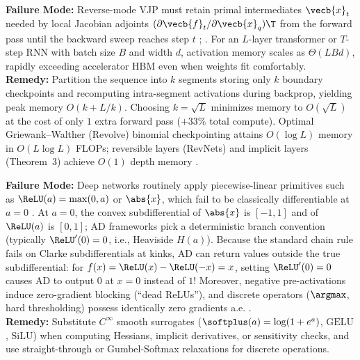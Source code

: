 \documentclass[../../../../master.tex]{subfiles}
\begin{document}
\begin{pitfall}
\textbf{Failure Mode:} Reverse-mode VJP must retain primal intermediates $\vecb{x}_t$ needed by local Jacobian adjoints $(\partial \vecb{f}_t/\partial \vecb{x}_q)\T$ from the forward pass until the backward sweep reaches step $t$ ; . For an $L$-layer transformer or $T$-step RNN with batch size $B$ and width $d$, activation memory scales as $\Theta(L B d)$, rapidly exceeding accelerator HBM even when weights fit comfortably.\\
\textbf{Remedy:} Partition the sequence into $k$ segments storing only $k$ boundary checkpoints and recomputing intra-segment activations during backprop, yielding peak memory $O(k + L/k)$. Choosing $k = \sqrt{L}$ minimizes memory to $O(\sqrt{L})$ at the cost of only $1$ extra forward pass ($+33\%$ total compute). Optimal Griewank--Walther (Revolve) binomial checkpointing attains $O(\log L)$ memory in $O(L \log L)$ FLOPs; reversible layers (RevNets) and implicit layers (Theorem~3) achieve $O(1)$ depth memory .
\end{pitfall}

\begin{pitfall}
\textbf{Failure Mode:} Deep networks routinely apply piecewise-linear primitives such as $\ReLU(a) = \max(0, a)$ or $\abs{x}$, which fail to be classically differentiable at $a = 0$ . At $a = 0$, the convex subdifferential of $\abs{x}$ is $[-1, 1]$ and of $\ReLU(a)$ is $[0, 1]$; AD frameworks pick a deterministic branch convention (typically $\ReLU'(0) = 0$, i.e., Heaviside $H(a)$). Because the standard chain rule fails on Clarke subdifferentials at kinks, AD can return values outside the true subdifferential: for $f(x) = \ReLU(x) - \ReLU(-x) = x$, setting $\ReLU'(0)=0$ causes AD to output $0$ at $x=0$ instead of $1$! Moreover, negative pre-activations induce zero-gradient blocking (``dead ReLUs''), and discrete operators ($\argmax$, hard thresholding) possess identically zero gradients a.e. .\\
\textbf{Remedy:} Substitute $C^\infty$ smooth surrogates ($\softplus(a) = \log(1 + e^a)$, $\mathrm{GELU}$, $\mathrm{SiLU}$) when computing Hessians, implicit derivatives, or sensitivity checks, and use straight-through or Gumbel-Softmax relaxations for discrete operations.
\end{pitfall}
\end{document}
